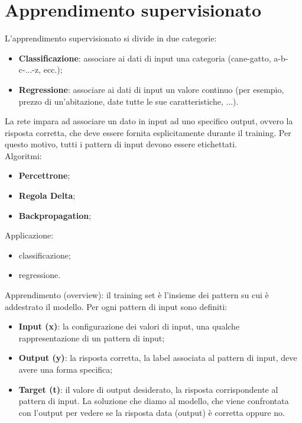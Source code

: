 \section{Apprendimento supervisionato}

L'apprendimento supervisionato si divide in due categorie:
\begin{itemize}
	\item \textbf{Classificazione}: associare ai dati di input una categoria
	(cane-gatto, a-b-c-...-z, ecc.);
	\item \textbf{Regressione}: associare ai dati di input un valore continuo
	(per esempio, prezzo di un'abitazione, date tutte le sue caratteristiche,
	...).
\end{itemize}

La rete impara ad associare un dato in input ad uno specifico output, ovvero la
risposta corretta, che deve essere fornita esplicitamente durante il training.
Per questo motivo, tutti i pattern di input devono essere etichettati.\\
Algoritmi:
\begin{itemize}
	\item \textbf{Percettrone};
	\item \textbf{Regola Delta};
	\item \textbf{Backpropagation};
\end{itemize}

Applicazione:
\begin{itemize}
	\item classificazione;
	\item regressione.
\end{itemize}

Apprendimento (overview): il training set è l'insieme dei pattern su cui è
addestrato il modello. Per ogni pattern di input sono definiti:
\begin{itemize}
	\item \textbf{Input (x)}: la configurazione dei valori di input, una qualche
	rappresentazione di un pattern di input;

	\item \textbf{Output (y)}: la risposta corretta, la label associata al
	pattern di input, deve avere una forma specifica;

	\item \textbf{Target (t)}: il valore di output desiderato, la risposta
	corrispondente al pattern di input. La soluzione che diamo al modello, che
	viene confrontata con l'output per vedere se la risposta data (output) è
	corretta oppure no.
\end{itemize}

